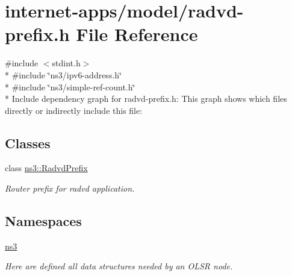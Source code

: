 \hypertarget{radvd-prefix_8h}{}\section{internet-\/apps/model/radvd-\/prefix.h File Reference}
\label{radvd-prefix_8h}
{\ttfamily \#include $<$stdint.\+h$>$}\\*
{\ttfamily \#include \char`\"{}ns3/ipv6-\/address.\+h\char`\"{}}\\*
{\ttfamily \#include \char`\"{}ns3/simple-\/ref-\/count.\+h\char`\"{}}\\*
Include dependency graph for radvd-\/prefix.h\+:
This graph shows which files directly or indirectly include this file\+:
\subsection*{Classes}
\begin{DoxyCompactItemize}
\item 
class \hyperlink{classns3_1_1RadvdPrefix}{ns3\+::\+Radvd\+Prefix}
\begin{DoxyCompactList}\small\item\em Router prefix for radvd application. \end{DoxyCompactList}\end{DoxyCompactItemize}
\subsection*{Namespaces}
\begin{DoxyCompactItemize}
\item 
 \hyperlink{namespacens3}{ns3}
\begin{DoxyCompactList}\small\item\em Here are defined all data structures needed by an O\+L\+SR node. \end{DoxyCompactList}\end{DoxyCompactItemize}
